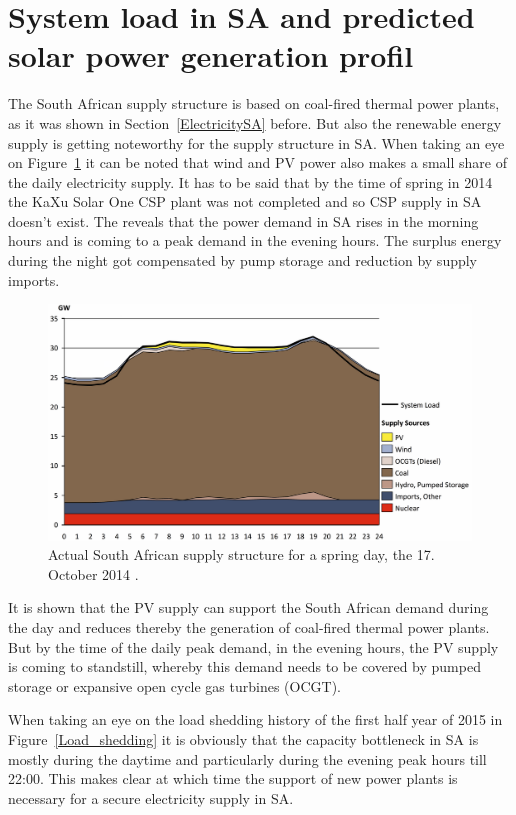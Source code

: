 \section{System load in SA and predicted solar power generation profil} \label{SystemloadinSA}
The South African supply structure is based on coal-fired thermal power plants, as it was shown in Section~\ref{ElectricitySA} before. But also the renewable energy supply is getting noteworthy for the supply structure in SA. When taking an eye on Figure~\ref{systemload} it can be noted that wind and PV power also makes a small share of the daily electricity supply. It has to be said that by the time of spring in 2014 the KaXu Solar One CSP plant was not completed and so CSP supply in SA doesn't exist. The reveals that the power demand in SA rises in the morning hours and is coming to a peak demand in the evening hours. The surplus energy during the night got compensated by pump storage and reduction by supply imports. 

\begin{figure}[htbp]  
\centering
\includegraphics[width=1\linewidth]{FIG/systemload}
\caption[Actual South African supply structure for a spring day, the 17. October 2014.]{Actual South African supply structure for a spring day, the 17. October 2014 \cite{CSIR2015}.}\label{systemload}
\end{figure}
It is shown that the PV supply can support the South African demand during the day and reduces thereby the generation of coal-fired thermal power plants. But by the time of the daily peak demand, in the evening hours, the PV supply is coming to standstill, whereby this demand needs to be covered by pumped storage or expansive open cycle gas turbines (OCGT).

When taking an eye on the load shedding history of the first half year of 2015 in Figure~\ref{Load_shedding} it is obviously that the capacity bottleneck in SA is mostly during the daytime and particularly during the evening peak hours till 22:00. This makes clear at which time the support of new power plants is necessary for a secure electricity supply in SA.
\pagebreak

